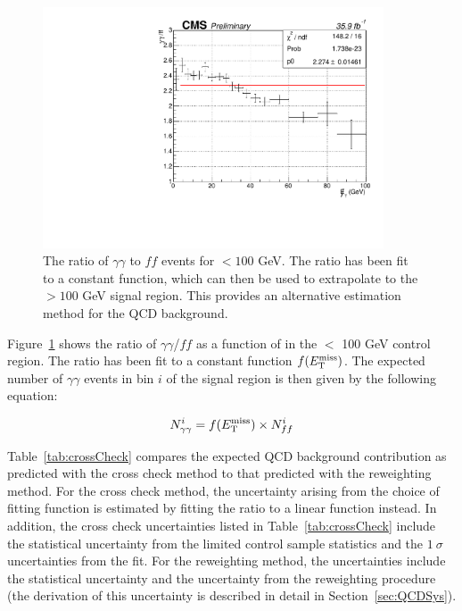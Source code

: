 \begin{figure}[h]
\begin{center}
\includegraphics[width=0.9\textwidth]{Figures/DataAnalysis/crossCheckFit.pdf}
\end{center}
\caption{The ratio of $\gamma\gamma$ to $ff$ events for \ETmiss$ < 100$ GeV. 
The ratio has been fit to a constant function, which can then be used to 
extrapolate to the \ETmiss$ >100$ GeV signal region. 
This provides an alternative estimation method for the QCD background.}
\label{fig:crossCheck}
\end{figure}

Figure~\ref{fig:crossCheck} shows the ratio of $\gamma\gamma$/$ff$ as a function of \ETmiss in the \ETmiss $<$ 100 GeV control region. The ratio has been fit to a constant function $f(E_{\mathrm{T}}^{\text{miss}})$. The expected number of $\gamma\gamma$ events in bin $i$ of the signal region is then given by the following equation:

\begin{equation}
N_{\gamma\gamma}^i = f(E_{\mathrm{T}}^{\text{miss}}) \times N_{ff}^i 
\end{equation}

Table~\ref{tab:crossCheck} compares the expected QCD background contribution as predicted with the cross check method to that predicted with the \diempt reweighting method. For the cross check method, the uncertainty arising from the choice of fitting function is estimated by fitting the ratio to a linear function instead. In addition, the cross check uncertainties listed in Table~\ref{tab:crossCheck} include the statistical uncertainty from the limited control sample statistics and the $1~\sigma$ uncertainties from the fit. For the \diempt reweighting method, the uncertainties include the statistical uncertainty and the uncertainty from the \diempt reweighting procedure (the derivation of this uncertainty is described in detail in Section~\ref{sec:QCDSys}). 

